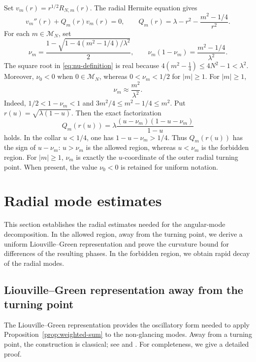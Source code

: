 \documentclass[10pt,a4paper]{amsart}
\numberwithin{equation}{section}
\begin{document}
Set \(v_m(r)=r^{1/2}R_{N,m}(r)\). The radial Hermite equation gives
\[
 v_m''(r)+Q_m(r)v_m(r)=0,
 \qquad
 Q_m(r)=\lambda-r^2-\frac{m^2-1/4}{r^2}.
\]
For each \(m\in\mathcal M_N\), set
\begin{equation}\label{eq:nu-definition}
 \nu_m=\frac{1-\sqrt{1-4(m^2-1/4)/\lambda^2}}2,
 \qquad
 \nu_m(1-\nu_m)=\frac{m^2-1/4}{\lambda^2}.
\end{equation}
The square root in \eqref{eq:nu-definition} is real because
\(4(m^2-\tfrac14)\le4N^2-1<\lambda^2\). Moreover, \(\nu_0<0\) when
\(0\in\mathcal M_N\), whereas \(0<\nu_m<1/2\) for \(|m|\ge1\). For
\(|m|\ge1\),
\begin{equation}\label{eq:nu-m-comparable}
 \nu_m\approx\frac{m^2}{\lambda^2}.
\end{equation}
Indeed, \(1/2<1-\nu_m<1\) and
\(3m^2/4\le m^2-1/4\le m^2\).
Put \(r(u)=\sqrt{\lambda(1-u)}\). Then the exact factorization
\begin{equation}\label{eq:Q-factor-u}
 Q_m(r(u))=
 \lambda\frac{(u-\nu_m)(1-u-\nu_m)}{1-u}
\end{equation}
holds. In the collar \(u<1/4\), one has \(1-u-\nu_m>1/4\). Thus
\(Q_m(r(u))\) has the sign of \(u-\nu_m\): \(u>\nu_m\) is the
allowed region, whereas \(u<\nu_m\) is the forbidden region. For \(|m|\ge1\), \(\nu_m\)
is exactly the \(u\)-coordinate of the outer radial turning point. When
present, the value \(\nu_0<0\) is retained for uniform notation.

\section{Radial mode estimates}\label{sec:radial}

This section establishes the radial estimates needed for the angular-mode
decomposition. In the allowed region, away from the turning
point, we derive a uniform Liouville--Green representation and prove the
curvature bound for differences of the resulting phases. In the forbidden
region, we obtain rapid decay of the radial modes. 

\subsection{Liouville--Green representation away from the turning point}

\noindent\hspace*{\parindent}The Liouville--Green representation provides the
oscillatory form needed to apply Proposition~\ref{prop:weighted-sum} to the
non-glancing modes. Away from a turning point, the construction is classical;
see \cite[Chapter~6, Sections~1--5]{Olver} and \cite{OlverLG}. For completeness,
we give a detailed proof.
\end{document}
